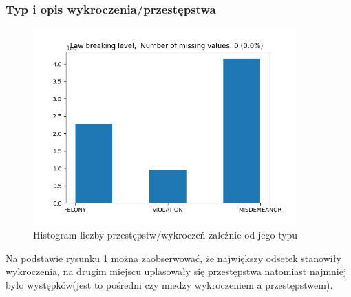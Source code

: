 \documentclass{classrep}
\begin{document}
{{            \subsubsection{Typ i opis wykroczenia/przestępstwa} {
                \begin{figure}[!htbp]
                    \centering
                    \includegraphics[width=0.9\textwidth]{img/Lawbreakinglevel-133608.png}
                    \caption{Histogram liczby przestępstw/wykroczeń zależnie od jego typu}
                    \label{hist_law_breaking_level}
                \end{figure}
                \FloatBarrier

                Na podstawie rysunku \ref{hist_law_breaking_level} można zaobserwować,
                że największy odsetek stanowiły wykroczenia, na drugim miejscu
                uplasowały się przestępstwa natomiast najmniej było występków(jest to
                pośredni czy miedzy wykroczeniem a przestępstwem).
            }

}}
\end{document}

